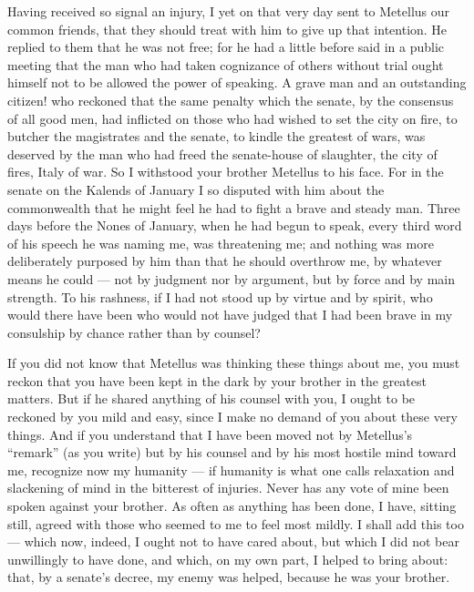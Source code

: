  Having received so signal an injury, I yet on that very day sent to Metellus our common friends, that they should treat with him to give up that intention. He replied to them that he was not free; for he had a little before said in a public meeting that the man who had taken cognizance of others without trial ought himself not to be allowed the power of speaking. A grave man and an outstanding citizen! who reckoned that the same penalty which the senate, by the consensus of all good men, had inflicted on those who had wished to set the city on fire, to butcher the magistrates and the senate, to kindle the greatest of wars, was deserved by the man who had freed the senate-house of slaughter, the city of fires, Italy of war. So I withstood your brother Metellus to his face. For in the senate on the Kalends of January I so disputed with him about the commonwealth that he might feel he had to fight a brave and steady man. Three days before the Nones of January, when he had begun to speak, every third word of his speech he was naming me, was threatening me; and nothing was more deliberately purposed by him than that he should overthrow me, by whatever means he could --- not by judgment nor by argument, but by force and by main strength. To his rashness, if I had not stood up by virtue and by spirit, who would there have been who would not have judged that I had been brave in my consulship by chance rather than by counsel?

 If you did not know that Metellus was thinking these things about me, you must reckon that you have been kept in the dark by your brother in the greatest matters. But if he shared anything of his counsel with you, I ought to be reckoned by you mild and easy, since I make no demand of you about these very things. And if you understand that I have been moved not by Metellus's ``remark'' (as you write) but by his counsel and by his most hostile mind toward me, recognize now my humanity --- if humanity is what one calls relaxation and slackening of mind in the bitterest of injuries. Never has any vote of mine been spoken against your brother. As often as anything has been done, I have, sitting still, agreed with those who seemed to me to feel most mildly. I shall add this too --- which now, indeed, I ought not to have cared about, but which I did not bear unwillingly to have done, and which, on my own part, I helped to bring about: that, by a senate's decree, my enemy was helped, because he was your brother.

